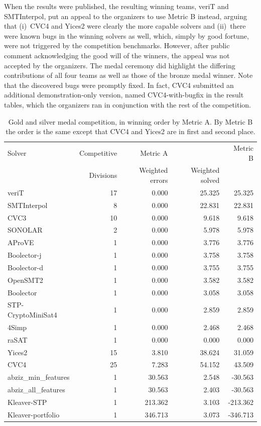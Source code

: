 \documentclass[twoside,11pt]{article}
\begin{document}
When the results were published, the resulting winning teams, veriT and SMTInterpol, put an appeal to the organizers to use Metric B instead, arguing that (i)~CVC4 and Yices2 were clearly the more capable solvers and (ii)~there were known bugs in the winning solvers as well, which, simply by good fortune, were not triggered by the competition benchmarks. However, after public comment acknowledging the good will of the winners, the appeal was not accepted by the organizers. The medal ceremony did highlight the differing contributions of all four teams as well as those of the bronze medal winner. Note that the discovered bugs were promptly fixed. In fact, CVC4 submitted an additional demonstration-only version, named CVC4-with-bugfix in the result tables, which the organizers ran in conjunction with the rest of the competition.

\begin{table}
\centering
\begin{tabular}{|l|r|rr|r|}
\hline
Solver  & Competitive & Metric A & & Metric B \\
 & Divisions & Weighted errors & Weighted solved & \\
\hline
veriT & 17 &	0.000 	& 	25.325 & 25.325 \\
SMTInterpol & 8 &	0.000 	& 	22.831 & 22.831 \\
CVC3 & 10	& 	0.000 	& 	9.618 & 9.618 \\
SONOLAR 	& 2	&  	0.000 	& 	5.978 & 	5.978\\
AProVE 		& 1 & 	0.000 	& 	3.776	& 	3.776\\
Boolector-j & 1	&  	0.000 	& 	3.758	& 	3.758\\
Boolector-d & 1		&  	0.000 	& 	3.755 & 	3.755\\
OpenSMT2 	& 1	&  	0.000 &	3.582 &	3.582\\
Boolector & 1		&  	0.000 &	3.058  &	3.058 \\
STP-CryptoMiniSat4 	& 1	&  	0.000 &	2.859 &	2.859\\
4Simp 	& 1	& 	0.000 	& 	2.468  	& 	2.468 \\
raSAT 	& 1	& 	0.000 	& 	0.000 	& 	0.000 \\
Yices2 	& 15	&  	3.810 	& 	38.624 & 31.059 \\
CVC4 		& 25 &  	7.283 	& 	54.152 & 43.509 \\
abziz\_min\_features 	& 1	& 	30.563 	& 	2.548 & -30.563 \\
abziz\_all\_features 	& 1	&  	30.563 	& 	2.403 & -30.563 \\
Kleaver-STP 	& 1	&  	213.362 	& 	3.103 & -213.362 \\
Kleaver-portfolio & 1		&  	346.713 	& 	3.073  & -346.713 \\
\hline
\end{tabular}
\vspace{.2in}
\caption{Gold and silver medal competition, in winning order by Metric A. By Metric B the order is the same except that CVC4 and Yices2 are in first and second place.}
\label{Table:medals}
\end{table}
\end{document}
